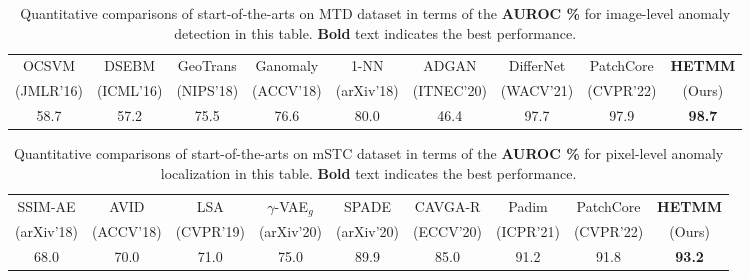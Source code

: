 \documentclass[default,iicol]{sn-jnl}\usepackage[algo2e,ruled,linesnumbered]{algorithm2e}
\theoremstyle{thmstyleone}\newtheorem{theorem}{Theorem}\newtheorem{proposition}[theorem]{Proposition}
\theoremstyle{thmstyletwo}\newtheorem{example}{Example}\newtheorem{remark}{Remark}
\theoremstyle{thmstylethree}\newtheorem{definition}{Definition}
\begin{document}
\begin{table*}[!t]
    \caption{
    Quantitative comparisons of start-of-the-arts on MTD dataset in terms of the \textbf{AUROC \%} for image-level anomaly detection in this table. 
    \textbf{Bold} text indicates the best performance.
    }
    \centering
    \tiny
    \setlength{\tabcolsep}{1.7mm}
    \begin{tabular}{ccccccccc}
    \hline                
    OCSVM\cite{OCSVM} &DSEBM\cite{DSEBM} &GeoTrans\cite{GeoTrans} &Ganomaly\cite{AUROC} &1-NN\cite{1-NN} &ADGAN\cite{ADGAN} &DifferNet\cite{DifferNet} &PatchCore\cite{patchcore} &\textbf{HETMM} \\
    (JMLR'16)         &(ICML'16)         &(NIPS'18)               &(ACCV'18)            &(arXiv'18)      &(ITNEC'20)         &(WACV'21)                &(CVPR'22)&(Ours)             \\
    \hline    
    58.7              &57.2              &75.5                    &76.6                 &80.0            &46.4                &97.7                   &97.9                      &\textbf{98.7}            \\
    \hline
    \end{tabular}
    \label{table:MTD}
\end{table*}

\begin{table*}[!t]
    \caption{
    Quantitative comparisons of start-of-the-arts on mSTC dataset in terms of the \textbf{AUROC \%} for pixel-level anomaly localization in this table. 
    \textbf{Bold} text indicates the best performance.
    }
    \centering
    \tiny
\begin{tabular}{ccccccccc}
    \hline
    SSIM-AE\cite{SSIM-AE} &AVID\cite{AVID}      &LSA\cite{LSA}       &$\gamma$-VAE$_{g}$\cite{yVAEg} &SPADE\cite{SPADE}      &CAVGA-R\cite{CAVGA-R}   &Padim\cite{Padim}     &PatchCore\cite{patchcore} &\textbf{HETMM}\\
    (arXiv'18)  &(ACCV'18) &(CVPR'19) &(arXiv'20)         &(arXiv'20) &(ECCV'20) &(ICPR'21) &(CVPR'22) &(Ours)  \\\hline
    68.0        &70.0      &71.0      &75.0               &89.9       &85.0      &91.2      &91.8      &\textbf{93.2}  \\\hline
    \end{tabular}
    \label{table:mSTC}
\end{table*}
\end{document}

